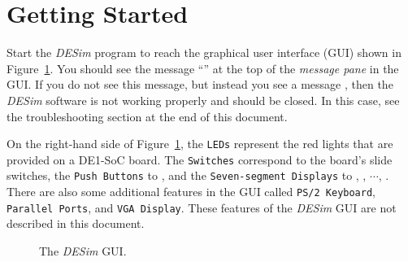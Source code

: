 \newpage

\section{Getting Started}
Start the {\it DESim} program to reach the graphical user interface (GUI) shown in 
Figure~\ref{fig:gui}. You should see the message ``'' at 
the top of the {\it message pane} in the GUI. If you do not see this message, but instead 
you see a message , then the {\it DESim} software is not working
properly and should be closed. In this case, see the troubleshooting section at the end
of this document.

On the right-hand side of Figure~\ref{fig:gui}, the \texttt{LEDs} represent the 
red lights  that are provided on a DE1-SoC board. The
\texttt{Switches} correspond to the board's  slide switches, the 
\texttt{Push Buttons} to , and the \texttt{Seven-segment
Displays} to , , $\cdots$, .
There are also some additional features in the GUI called \texttt{PS/2 Keyboard}, 
\texttt{Parallel Ports}, and \texttt{VGA Display}. These features of
the {\it DESim} GUI are not described in this document. 

\begin{figure}[h]
	\begin{center}
        \setlength{\fboxsep}{0pt}
	\end{center}
		  \caption{The {\it DESim} GUI.}
	\label{fig:gui}
\end{figure}

